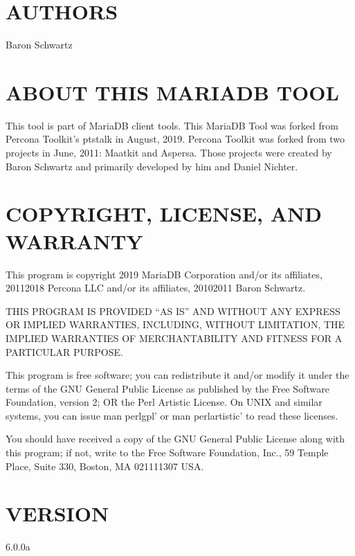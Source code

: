 \documentclass[letterpaper,10pt,english]{sphinxmanual}
\begin{document}
\section{AUTHORS}
\label{\detokenize{mariadb-stat-browser:authors}}
\sphinxAtStartPar
Baron Schwartz


\section{ABOUT THIS MARIADB TOOL}
\label{\detokenize{mariadb-stat-browser:about-this-mariadb-tool}}
\sphinxAtStartPar
This tool is part of MariaDB client tools. This MariaDB Tool was forked from
Percona Toolkit’s pt\sphinxhyphen{}stalk in August, 2019. Percona Toolkit was forked from two
projects in June, 2011: Maatkit and Aspersa.  Those projects were created by
Baron Schwartz and primarily developed by him and Daniel Nichter.


\section{COPYRIGHT, LICENSE, AND WARRANTY}
\label{\detokenize{mariadb-stat-browser:copyright-license-and-warranty}}
\sphinxAtStartPar
This program is copyright 2019 MariaDB Corporation and/or its affiliates,
2011\sphinxhyphen{}2018 Percona LLC and/or its affiliates, 2010\sphinxhyphen{}2011 Baron Schwartz.

\sphinxAtStartPar
THIS PROGRAM IS PROVIDED “AS IS” AND WITHOUT ANY EXPRESS OR IMPLIED
WARRANTIES, INCLUDING, WITHOUT LIMITATION, THE IMPLIED WARRANTIES OF
MERCHANTABILITY AND FITNESS FOR A PARTICULAR PURPOSE.

\sphinxAtStartPar
This program is free software; you can redistribute it and/or modify it under
the terms of the GNU General Public License as published by the Free Software
Foundation, version 2; OR the Perl Artistic License.  On UNIX and similar
systems, you can issue \textasciigrave{}man perlgpl’ or \textasciigrave{}man perlartistic’ to read these
licenses.

\sphinxAtStartPar
You should have received a copy of the GNU General Public License along with
this program; if not, write to the Free Software Foundation, Inc., 59 Temple
Place, Suite 330, Boston, MA  02111\sphinxhyphen{}1307  USA.


\section{VERSION}
\label{\detokenize{mariadb-stat-browser:version}}
\sphinxAtStartPar
{} 6.0.0a
\end{document}
